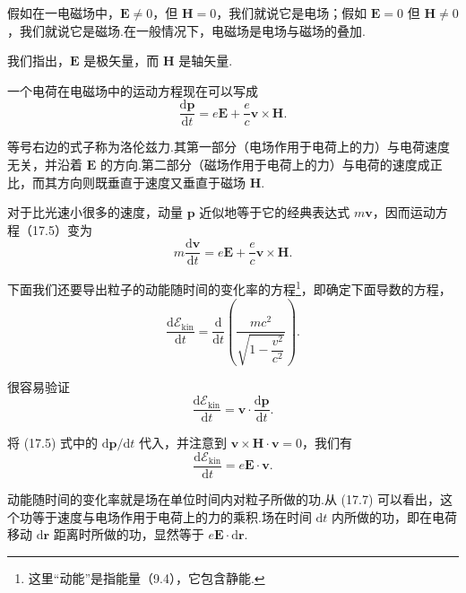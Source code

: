 假如在一电磁场中，$\boldsymbol{E}\neq0$，但 $\boldsymbol{H}=0$，我们就说它是电场；假如
$\boldsymbol{E}=0$ 但 $\boldsymbol{H}\neq0$，我们就说它是磁场.在一般情况下，电磁场是电场与磁场的叠加.

我们指出，$\boldsymbol{E}$ 是极矢量，而 $\boldsymbol{H}$ 是轴矢量.

一个电荷在电磁场中的运动方程现在可以写成
\begin{equation}
  \frac{\mathrm{d}\boldsymbol{p}}{\mathrm{d}t}
  =e\boldsymbol{E}+\frac{e}{c}\boldsymbol{v}\times\boldsymbol{H}.
\end{equation}

等号右边的式子称为洛伦兹力.其第一部分（电场作用于电荷上的力）与电荷速度无关，并沿着 $\boldsymbol{E}$ 的方向.第二部分（磁场作用于电荷上的力）与电荷的速度成正比，而其方向则既垂直于速度又垂直于磁场 $\boldsymbol{H}$.

对于比光速小很多的速度，动量 $\boldsymbol{p}$ 近似地等于它的经典表达式
$m\boldsymbol{v}$，因而运动方程（17.5）变为
\begin{equation}
  m\frac{\mathrm{d}\boldsymbol{v}}{\mathrm{d}t}
  =e\boldsymbol{E}+\frac{e}{c}\boldsymbol{v}\times\boldsymbol{H}.
\end{equation}

下面我们还要导出粒子的动能随时间的变化率的方程\footnote{这里“动能”是指能量（9.4），它包含静能.}，即确定下面导数的方程，
\begin{equation*}
  \frac{\mathrm{d}\mathcal{E}_\mathrm{kin}}{\mathrm{d}t}
  =\frac{\mathrm{d}}{\mathrm{d}t}
  \left(\frac{mc^2}{\sqrt{1-\dfrac{v^2}{c^2}}}\right).
\end{equation*}

很容易验证
\begin{equation*}
  \frac{\mathrm{d}\mathcal{E}_\mathrm{kin}}{\mathrm{d}t}
  =\boldsymbol{v}\cdot\frac{\mathrm{d}\boldsymbol{p}}{\mathrm{d}t}.
\end{equation*}

将 (17.5) 式中的 $\mathrm{d}\boldsymbol{p}/\mathrm{d}t$ 代入，并注意到
$\boldsymbol{v}\times\boldsymbol{H}\cdot\boldsymbol{v}=0$，我们有
\begin{equation}
  \frac{\mathrm{d}\mathcal{E}_\mathrm{kin}}{\mathrm{d}t}=e\boldsymbol{E}\cdot\boldsymbol{v}.
\end{equation}

动能随时间的变化率就是场在单位时间内对粒子所做的功.从 (17.7) 可以看出，这个功等于速度与电场作用于电荷上的力的乘积.场在时间 $\mathrm{d}t$ 内所做的功，即在电荷移动
$\mathrm{d}\boldsymbol{r}$ 距离时所做的功，显然等于 $e\boldsymbol{E}\cdot\mathrm{d}\boldsymbol{r}$.

